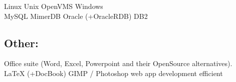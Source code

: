 \documentclass[letterpaper]{deedy-resume.en} %
\begin{document}
\begin{minipage}[t]{0.60\textwidth}
Linux \textbullet{} Unix \textbullet{} OpenVMS \textbullet{} Windows \\

MySQL \textbullet{} MimerDB \textbullet{} Oracle (+OracleRDB) \textbullet{} DB2 \\

\sectionspace %

\subsection{Other:}
Office suite (Word, Excel, Powerpoint and their OpenSource alternatives). \\
LaTeX (+DocBook) \textbullet{} GIMP / Photoshop web app development efficient \\

\end{minipage} %

\end{document}
